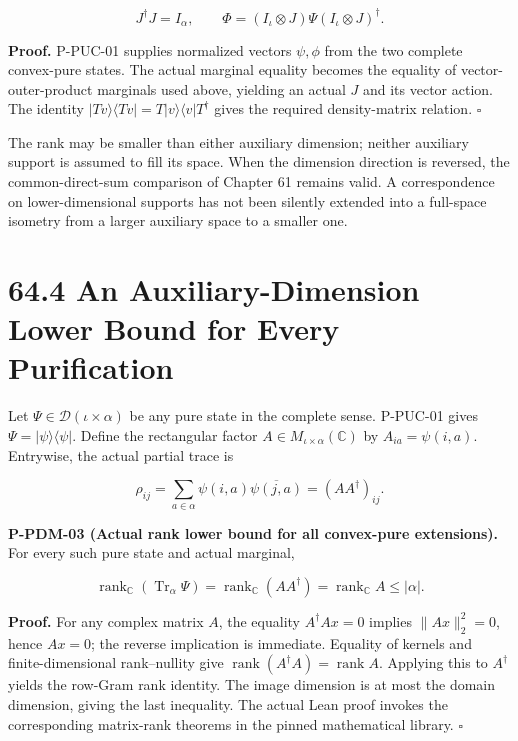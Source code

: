 \documentclass[
  11pt,
  oneside]{book}
\begin{document}
\[
J^\dagger J=I_\alpha,\qquad
\Phi=(I_\iota\otimes J)\Psi(I_\iota\otimes J)^\dagger.
\]

\textbf{Proof.} P-PUC-01 supplies normalized vectors \(\psi,\phi\) from
the two complete convex-pure states. The actual marginal equality
becomes the equality of vector-outer-product marginals used above,
yielding an actual \(J\) and its vector action. The identity
\(|Tv\rangle\langle Tv|=T|v\rangle\langle v|T^\dagger\) gives the
required density-matrix relation. \(\square\)

The rank may be smaller than either auxiliary dimension; neither
auxiliary support is assumed to fill its space. When the dimension
direction is reversed, the common-direct-sum comparison of Chapter 61
remains valid. A correspondence on lower-dimensional supports has not
been silently extended into a full-space isometry from a larger
auxiliary space to a smaller one.

\section{64.4 An Auxiliary-Dimension Lower Bound for Every Purification}

Let \(\Psi\in\mathcal D(\iota\times\alpha)\) be any pure state in the
complete sense. P-PUC-01 gives \(\Psi=|\psi\rangle\langle\psi|\). Define
the rectangular factor \(A\in M_{\iota\times\alpha}(\mathbb C)\) by
\(A_{ia}=\psi(i,a)\). Entrywise, the actual partial trace is

\[
\rho_{ij}=
\sum_{a\in\alpha}\psi(i,a)\overline{\psi(j,a)}
=(AA^\dagger)_{ij}.
\]

\label{p-pdm-03}{}

\textbf{P-PDM-03 (Actual rank lower bound for all convex-pure
extensions).} For every such pure state and actual marginal,

\[
\operatorname{rank}_{\mathbb C}(\operatorname{Tr}_\alpha\Psi)
=\operatorname{rank}_{\mathbb C}(AA^\dagger)
=\operatorname{rank}_{\mathbb C}A
\le |\alpha|.
\]

\textbf{Proof.} For any complex matrix \(A\), the equality
\(A^\dagger A x=0\) implies \(\|Ax\|_2^2=0\), hence \(Ax=0\); the
reverse implication is immediate. Equality of kernels and
finite-dimensional rank--nullity give
\(\operatorname{rank}(A^\dagger A)=\operatorname{rank}A\). Applying this
to \(A^\dagger\) yields the row-Gram rank identity. The image dimension
is at most the domain dimension, giving the last inequality. The actual
Lean proof invokes the corresponding matrix-rank theorems in the pinned
mathematical library. \(\square\)
\end{document}
